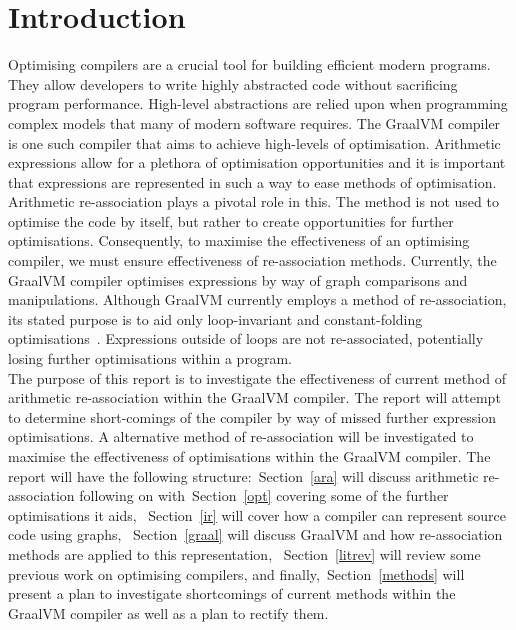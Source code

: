 \documentclass[12pt,openany,a4paper]{book}
\newcommand{\secn}[1] {Section~\ref{#1}}	%
\begin{document}
\cleardoublepage

\mainmatter


%
%
%
%	
%	

\chapter{Introduction}
\label{intro}

Optimising compilers are a crucial tool for building efficient 
modern programs. They allow developers to write highly abstracted code without 
sacrificing program performance. High-level abstractions are relied upon when
programming complex models that many of modern software requires. The GraalVM
compiler is one such compiler that aims to achieve high-levels of optimisation.
Arithmetic expressions allow for a plethora of optimisation opportunities and it is important that
expressions are represented in such a way to ease methods of optimisation. 
Arithmetic re-association plays a pivotal role in this. The method is not used
to optimise the code by itself, but rather to create opportunities for further
optimisations. Consequently, to maximise the effectiveness of an optimising
compiler, we must ensure effectiveness of re-association methods. 
Currently, the GraalVM compiler optimises expressions by way 
of graph comparisons and manipulations. Although GraalVM currently employs a 
method of re-association, its stated purpose is to aid only loop-invariant
and constant-folding optimisations~\cite{graalsrc}. Expressions outside of loops are not
re-associated, potentially losing further optimisations within a program.\\
The purpose of this report is to investigate the effectiveness of current method
of arithmetic re-association within the GraalVM compiler. The report will attempt
to determine short-comings of the compiler by way of missed further expression optimisations.
A alternative method of re-association will be investigated to maximise the
effectiveness of optimisations within the GraalVM compiler.
The report will have the following structure:~\secn{ara} will discuss
arithmetic re-association following on with~\secn{opt} covering some of the further optimisations it aids,
~\secn{ir} will cover how a compiler can represent source code using graphs,
~\secn{graal} will discuss GraalVM and how re-association methods are applied 
to this representation, ~\secn{litrev} will review some previous work on 
optimising compilers, and finally,~\secn{methods} will present a 
plan to investigate shortcomings of current methods within the GraalVM compiler
as well as a plan to rectify them.
\end{document}
